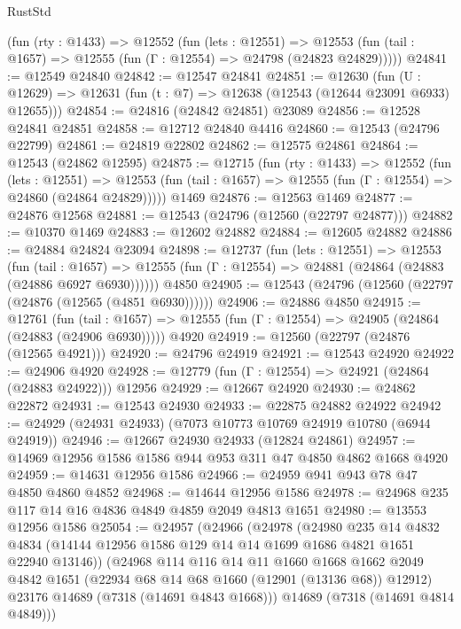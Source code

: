 \begin{lexlean}{RustStd}
\begin{coremodule}
    (fun (rty : @1433) =>
    @12552
      (fun (lets : @12551) =>
      @12553 (fun (tail : @1657) => @12555 (fun (Γ : @12554) => @24798 (@24823 @24829)))))
@24841 := @12549 @24840
@24842 := @12547 @24841
@24851 := @12630
    (fun (U : @12629) => @12631 (fun (t : @7) => @12638 (@12543 (@12644 @23091 @6933) @12655)))
@24854 := @24816 (@24842 @24851) @23089
@24856 := @12528 @24841 @24851
@24858 := @12712 @24840 @4416
@24860 := @12543 (@24796 @22799)
@24861 := @24819 @22802
@24862 := @12575 @24861
@24864 := @12543 (@24862 @12595)
@24875 := @12715
    (fun (rty : @1433) =>
    @12552
      (fun (lets : @12551) =>
      @12553 (fun (tail : @1657) => @12555 (fun (Γ : @12554) => @24860 (@24864 @24829)))))
    @1469
@24876 := @12563 @1469
@24877 := @24876 @12568
@24881 := @12543 (@24796 (@12560 (@22797 @24877)))
@24882 := @10370 @1469
@24883 := @12602 @24882
@24884 := @12605 @24882
@24886 := @24884 @24824 @23094
@24898 := @12737
    (fun (lets : @12551) =>
    @12553
      (fun (tail : @1657) =>
      @12555 (fun (Γ : @12554) => @24881 (@24864 (@24883 (@24886 @6927 @6930))))))
    @4850
@24905 := @12543 (@24796 (@12560 (@22797 (@24876 (@12565 (@4851 @6930))))))
@24906 := @24886 @4850
@24915 := @12761
    (fun (tail : @1657) => @12555 (fun (Γ : @12554) => @24905 (@24864 (@24883 (@24906 @6930)))))
    @4920
@24919 := @12560 (@22797 (@24876 (@12565 @4921)))
@24920 := @24796 @24919
@24921 := @12543 @24920
@24922 := @24906 @4920
@24928 := @12779 (fun (Γ : @12554) => @24921 (@24864 (@24883 @24922))) @12956
@24929 := @12667 @24920
@24930 := @24862 @22872
@24931 := @12543 @24930
@24933 := @22875 @24882 @24922
@24942 := @24929 (@24931 @24933) (@7073 @10773 @10769 @24919 @10780 (@6944 @24919))
@24946 := @12667 @24930 @24933 (@12824 @24861)
@24957 := @14969 @12956 @1586 @1586 @944 @953 @311 @47 @4850 @4862 @1668 @4920
@24959 := @14631 @12956 @1586
@24966 := @24959 @941 @943 @78 @47 @4850 @4860 @4852
@24968 := @14644 @12956 @1586
@24978 := @24968 @235 @117 @14 @16 @4836 @4849 @4859 @2049 @4813 @1651
@24980 := @13553 @12956 @1586
@25054 := @24957
    (@24966
      (@24978
        (@24980
          @235
          @14
          @4832
          @4834
          (@14144 @12956 @1586 @129 @14 @14 @1699 @1686 @4821 @1651 @22940 @13146))
        (@24968
          @114
          @116
          @14
          @11
          @1660
          @1668
          @1662
          @2049
          @4842
          @1651
          (@22934 @68 @14 @68 @1660 (@12901 (@13136 @68)) @12912)
          @23176
          @14689
          (@7318 (@14691 @4843 @1668)))
        @14689
        (@7318 (@14691 @4814 @4849)))

\end{coremodule}
\end{lexlean}
